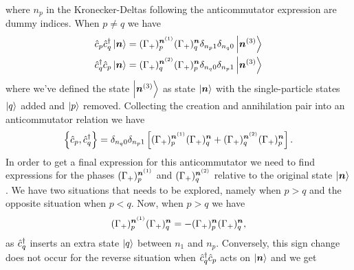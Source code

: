             where $n_p$ in the Kronecker-Deltas following the anticommutator
            expression are dummy indices.
            When $p \neq q$ we have
            \begin{align}
                \hat{c}_{p}\hat{c}_{q}^{\dagger}\ket{\boldsymbol{n}}
                &=
                (\Gamma_{+})^{\boldsymbol{n}^{(1)}}_{p}
                (\Gamma_{+})^{\boldsymbol{n}}_{q}
                \delta_{n_p 1} \delta_{n_q 0}
                \ket{\boldsymbol{n}^{(3)}}
                \\
                \hat{c}_{q}^{\dagger}\hat{c}_{p}\ket{\boldsymbol{n}}
                &=
                (\Gamma_{+})^{\boldsymbol{n}^{(2)}}_{q}
                (\Gamma_{+})^{\boldsymbol{n}}_{p}
                \delta_{n_q 0} \delta_{n_p 1}
                \ket{\boldsymbol{n}^{(3)}}
            \end{align}
            where we've defined the state $\ket{\boldsymbol{n}^{(3)}}$ as state
            $\ket{\boldsymbol{n}}$ with the single-particle states $\ket{q}$ added and
            $\ket{p}$ removed.
            Collecting the creation and annihilation pair into an anticommutator
            relation we have
            \begin{align}
                \left\{\hat{c}_{p}, \hat{c}_{q}^{\dagger}\right\}
                =
                \delta_{n_q 0} \delta_{n_p 1}
                \left[ 
                    (\Gamma_{+})^{\boldsymbol{n}^{(1)}}_{p}
                    (\Gamma_{+})^{\boldsymbol{n}}_{q}
                    +
                    (\Gamma_{+})^{\boldsymbol{n}^{(2)}}_{q}
                    (\Gamma_{+})^{\boldsymbol{n}}_{p}
                 \right].
            \end{align}
            In order to get a final expression for this anticommutator we need
            to find expressions for the phases
            $(\Gamma_{+})^{\boldsymbol{n}^{(1)}}_{p}$ and
            $(\Gamma_{+})^{\boldsymbol{n}^{(2)}}_{q}$ relative to the original state
            $\ket{\boldsymbol{n}}$.
            We have two situations that needs to be explored, namely when $p >
            q$ and the opposite situation when $p < q$.
            Now, when $p > q$ we have
            \begin{align}
                (\Gamma_{+})^{\boldsymbol{n}^{(1)}}_{p}
                (\Gamma_{+})^{\boldsymbol{n}}_{q}
                =
                -
                (\Gamma_{+})^{\boldsymbol{n}}_{p}
                (\Gamma_{+})^{\boldsymbol{n}}_{q},
            \end{align}
            as $\hat{c}_{q}^{\dagger}$ inserts an extra state $\ket{q}$ between $n_1$ and
            $n_p$.
            Conversely, this sign change does not occur for the reverse
            situation when $\hat{c}_{q}^{\dagger}\hat{c}_{p}$ acts on $\ket{\boldsymbol{n}}$ and we get
